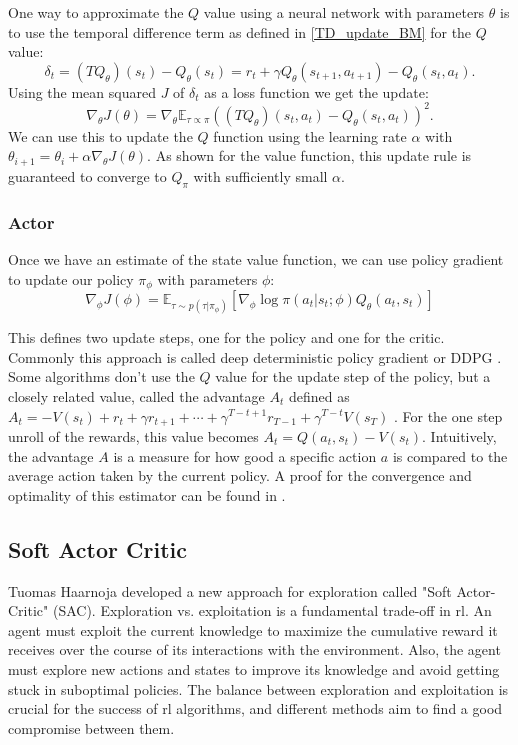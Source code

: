 One way to approximate the $Q$ value using a neural network with parameters $\theta$ is to use the temporal difference term as defined in \ref{TD_update_BM} for the $Q$ value:
\begin{equation}
    \label{Q-ValueTD}
    \delta_t = (T Q_{\theta})(s_t) - Q_{\theta}(s_t) = r_t + \gamma Q_{\theta}(s_{t+1}, a_{t+1}) - Q_{\theta}(s_{t}, a_{t}).
\end{equation}
Using the mean squared $J$ of $\delta_t$ as a loss function we get the update:
\begin{equation}
    \nabla_{\theta} J(\theta) = \nabla_{\theta} \mathbb{E}_{\tau \propto \pi}((T Q_{\theta})(s_t, a_t) - Q_{\theta}(s_t, a_t))^2.
\end{equation}
We can use this to update the $Q$ function using the learning rate $\alpha$ with $\theta_{i+1} = \theta_i + \alpha \nabla_{\theta} J(\theta)$. As shown for the value 
function, this update rule is guaranteed to converge to $Q_{\pi}$ with sufficiently small $\alpha$.

\subsubsection{Actor}
Once we have an estimate of the state value function, we can use policy gradient to update our policy $\pi_{\phi}$ with parameters $\phi$:
\begin{equation}
    \label{AC_general_update}
    \nabla_{\phi} J(\phi) = \mathbb{E}_{\tau \sim p(\tau | \pi_{\phi})} \left[\nabla_{\phi} \log \pi(a_t|s_t;\phi) Q_{\theta}(a_t, s_t) \right]
\end{equation}

This defines two update steps, one for the policy and one for the critic. Commonly this approach is called deep deterministic policy gradient or DDPG \cite{lillicrap2019continuous}. 
Some algorithms don't use the $Q$ value for the update step of the policy, but a closely 
related value, called the advantage $A_t$ defined as $A_t = -V(s_t) + r_t + \gamma r_{t+1} + \cdots + \gamma^{T-t+1} r_{T-1} + \gamma^{T-t} V(s_T)$ \cite{A2C}. For the one step 
unroll of the rewards, this value becomes $A_t = Q(a_t, s_t) - V(s_t)$. 
Intuitively, the advantage $A$ is a measure for how good a specific action $a$ is compared to the average action taken by the current policy. 
A proof for the convergence and optimality of this estimator can be found in \cite{proof_A}.

\subsection{Soft Actor Critic}
\label{SAC}
Tuomas Haarnoja \etAl \cite{haarnoja2018soft} developed a new approach for exploration called "Soft Actor-Critic" (SAC). Exploration vs. exploitation 
is a fundamental trade-off in \ac{rl}. An agent must exploit the current knowledge to maximize the cumulative reward it receives 
over the course of its interactions with the environment. Also, the agent must explore new actions and states to improve its knowledge and avoid getting stuck in suboptimal policies. 
The balance between exploration and exploitation is crucial for the success of \ac{rl} algorithms, and different methods aim to find a good compromise between them.

